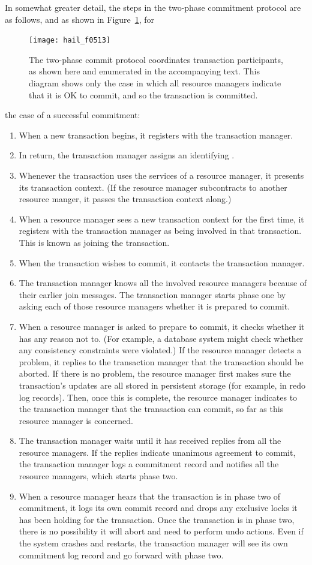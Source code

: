 In somewhat greater detail, the steps in the two-phase commitment
protocol are as follows, and as shown in Figure~\ref{scan-5-15}, for
\begin{figure}
\centerline{\texttt{[image: hail\_f0513]}}
\caption{The two-phase commit protocol coordinates transaction
  participants, as shown here and enumerated in the accompanying text.
  This diagram shows only the case in which all resource managers
  indicate that it is OK to commit, and so the transaction is committed.}
\label{scan-5-15}
\end{figure}
the case of a successful commitment:
\begin{enumerate}
\item
When a new transaction begins, it registers with the transaction
manager.
\item
In return, the transaction manager assigns an identifying .
\item
Whenever the transaction uses the services of a resource manager, it
presents its transaction context.  (If the resource manager
subcontracts to another resource manger, it passes the transaction
context along.)
\item
When a resource manager sees a new transaction context for the first
time, it registers with the transaction manager as being involved in
that transaction.  This is known as joining the transaction.
\item
When the transaction wishes to commit, it contacts the transaction
manager.
\item
The transaction manager knows all the involved resource
managers because of their earlier join messages.  The transaction
manager starts phase one by asking each of those resource managers
whether it is prepared to commit.
\item
When a resource manager is asked to prepare to commit, it checks
whether it has any reason not to.  (For example, a database system
might check whether any consistency constraints were violated.)  If
the resource manager detects a problem, it replies to the transaction
manager that the transaction should be aborted.  If there is no
problem, the resource manager first makes sure the transaction's
updates are all stored in persistent storage (for example, in redo log
records).  Then, once this is complete, the resource manager indicates
to the transaction manager that the transaction can commit, so far as
this resource manager is concerned.
\item
The transaction manager waits until it has received replies from all
the resource managers.  If the replies indicate unanimous agreement to
commit, the transaction manager logs a commitment record and notifies
all the resource managers, which starts phase two.
\item
When a resource manager hears that the transaction is in phase two of
commitment, it logs its own commit record and drops any exclusive
locks it has been holding for the transaction.  Once the transaction
is in phase two, there is no possibility it will abort and need to
perform undo actions.  Even if the system crashes and restarts, the transaction
manager will see its own commitment log record and go forward with
phase two.


\end{enumerate}
